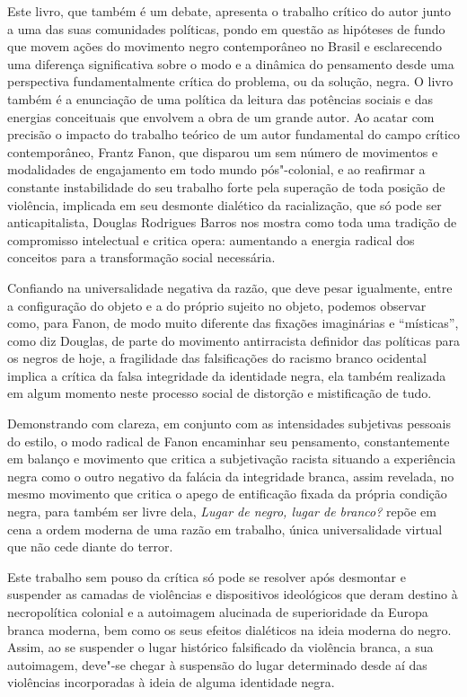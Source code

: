 Este livro, que também é um debate, apresenta o trabalho crítico do
autor junto a uma das suas comunidades políticas, pondo em questão as
hipóteses de fundo que movem ações do movimento negro contemporâneo no
Brasil e esclarecendo uma diferença significativa sobre o modo e a
dinâmica do pensamento desde uma perspectiva fundamentalmente crítica do
problema, ou da solução, negra. O livro também é a enunciação de uma
política da leitura das potências sociais e das energias conceituais que
envolvem a obra de um grande autor. Ao acatar com precisão o impacto do
trabalho teórico de um autor fundamental do campo crítico contemporâneo,
Frantz Fanon, que disparou um sem número de movimentos e modalidades de
engajamento em todo mundo pós"-colonial, e ao reafirmar a constante
instabilidade do seu trabalho forte pela superação de toda posição de
violência, implicada em seu desmonte dialético da racialização, que só
pode ser anticapitalista, Douglas Rodrigues Barros nos mostra como toda
uma tradição de compromisso intelectual e critica opera: aumentando a
energia radical dos conceitos para a transformação social necessária.

Confiando na universalidade negativa da razão, que deve pesar
igualmente, entre a configuração do objeto e a do próprio sujeito no
objeto, podemos observar como, para Fanon, de modo muito diferente das
fixações imaginárias e ``místicas'', como diz Douglas, de parte do
movimento antirracista definidor das políticas para os negros de hoje, a
fragilidade das falsificações do racismo branco ocidental implica a
crítica da falsa integridade da identidade negra, ela também realizada
em algum momento neste processo social de distorção e mistificação de
tudo.

Demonstrando com clareza, em conjunto com as intensidades subjetivas
pessoais do estilo, o modo radical de Fanon encaminhar seu pensamento,
constantemente em balanço e movimento que critica a subjetivação racista
situando a experiência negra como o outro negativo da falácia da
integridade branca, assim revelada, no mesmo movimento que critica o
apego de entificação fixada da própria condição negra, para também ser
livre dela, \emph{Lugar de negro, lugar de branco?} repõe em cena a ordem
moderna de uma razão em trabalho, única universalidade virtual que não
cede diante do terror.

Este trabalho sem pouso da crítica só pode se resolver após desmontar e
suspender as camadas de violências e dispositivos ideológicos que deram
destino à necropolítica colonial e a autoimagem alucinada de
superioridade da Europa branca moderna, bem como os seus efeitos
dialéticos na ideia moderna do negro. Assim, ao se suspender o lugar
histórico falsificado da violência branca, a sua autoimagem, deve"-se
chegar à suspensão do lugar determinado desde aí das violências
incorporadas à ideia de alguma identidade negra.

